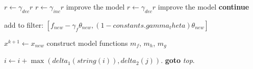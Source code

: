 \documentclass{article}
\begin{document}
\begin{algorithm}
\begin{algorithmic}[1]
	\State 
			\State $r \gets \gamma_{dec} r$
		\Else
			\State $r \gets \gamma_{inc} r$
		\EndIf
		\State improve the model
			\State $r \gets \gamma_{dec} r$
		\EndIf
		\State improve the model
	\Else
		\textbf{continue}
	\EndIf
	
	
	
		add to filter: $[f_{new} - \gamma_f \theta_{new}, (1 - constants.gamma_theta)  \theta_{new}]$
	\EndIf

	\State $x^{k+1} \gets x_{new}$
	\State construct model functions $m_f$, $m_h$, $m_g$
\EndIf
\EndWhile
% 
% 
% 
% 
% 
% 
% 
% 

% 
% 
% 


\State $i \gets i+\max(\textit{delta}_1(\textit{string}(i)),\textit{delta}_2(j))$.
\State \textbf{goto} \emph{top}.
\EndProcedure
\end{algorithmic}
\end{algorithm}
\end{document}
